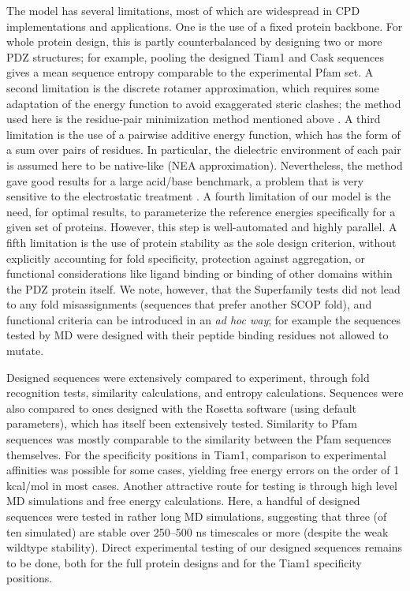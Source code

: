\documentclass[12pt]{article}
\begin{document}
The model has several limitations, most of which are widespread in CPD implementations and applications. One is the use of a fixed
protein backbone. For whole protein design, this is partly counterbalanced by designing two or more PDZ structures; for example,
pooling the designed Tiam1 and Cask sequences gives a mean sequence entropy comparable to the experimental Pfam set. A second
limitation is the discrete rotamer approximation, which requires some adaptation of the energy function to avoid exaggerated steric
clashes; the method used here is the residue-pair minimization method mentioned above \cite{Schmidt08,Simonson13}. A third limitation
is the use of a pairwise additive energy function, which has the form of a sum over pairs of residues. In particular, the dielectric
environment of each pair is assumed here to be native-like (NEA approximation). Nevertheless, the method gave good results for a
large acid/base benchmark, a problem that is very sensitive to the electrostatic treatment \cite{Polydorides13}. A fourth limitation
of our model is the need, for optimal results, to parameterize the reference energies specifically for a given set of proteins.
However, this step is well-automated and highly parallel. A fifth limitation is the use of protein stability as the sole design
criterion, without explicitly accounting for fold specificity, protection against aggregation, or functional considerations like
ligand binding or binding of other domains within the PDZ protein itself. We note, however, that the Superfamily tests did not
lead to any fold misassignments (sequences that prefer another SCOP fold), and functional criteria can be introduced in an {\it
ad hoc way}; for example the sequences tested by MD were designed with their peptide binding residues not allowed to mutate. 

Designed sequences were extensively compared to experiment, through fold recognition tests, similarity calculations, and entropy
calculations. Sequences were also compared to ones designed with the Rosetta software (using default parameters), which has itself
been extensively tested. Similarity to Pfam sequences was mostly comparable to the similarity between the Pfam sequences themselves.
For the specificity positions in Tiam1, comparison to experimental affinities was possible for some cases, yielding free energy
errors on the order of 1 kcal/mol in most cases. Another attractive route for testing is through high level MD simulations and
free energy calculations. Here, a handful of designed sequences were tested in rather long MD simulations, suggesting that three
(of ten simulated) are stable over 250--500 ns timescales or more (despite the weak wildtype stability). Direct experimental
testing of our designed sequences remains to be done, both for the full protein designs and for the Tiam1 specificity positions.
\end{document}
